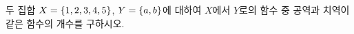두 집합 $X=\{1{,}\mkern3mu\mathopen{}2{,}\mkern3mu\mathopen{}3{,}\mkern3mu\mathopen{}4{,}\mkern3mu\mathopen{}5\}$, $Y=\{a{,}\mkern3mu\mathopen{}b\}$에 대하여 $X$에서 $Y$로의 함수 중 공역과 치역이 같은 함수의 개수를 구하시오.
